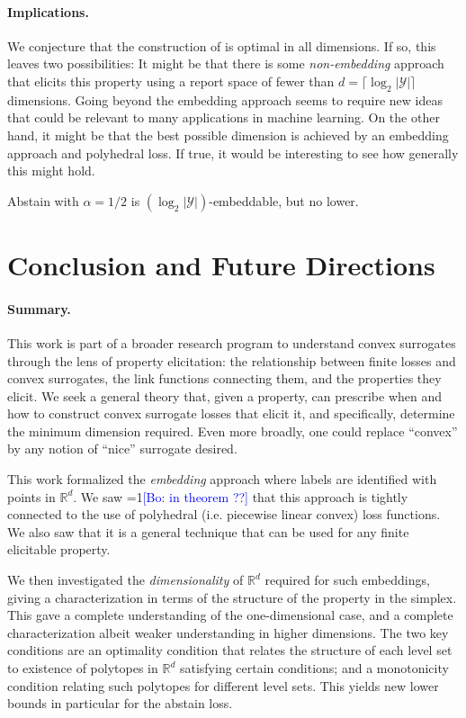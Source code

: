 \documentclass[anon,12pt]{colt2019}
\newcommand{\Comments}{1}
\newcommand{\mynote}[2]{\ifnum\Comments=1\textcolor{#1}{#2}\fi}
\newcommand{\bo}[1]{\mynote{blue}{[Bo: #1]}}
\newcommand{\reals}{\mathbb{R}}
\newcommand{\Y}{\mathcal{Y}}
\begin{document}
\paragraph{Implications.}
We conjecture that the construction of \citet{ramaswamy2018consistent} is optimal in all dimensions.
If so, this leaves two possibilities: It might be that there is some \emph{non-embedding} approach that elicits this property using a report space of fewer than $d=\lceil \log_2 |\Y|\rceil$ dimensions.
Going beyond the embedding approach seems to require new ideas that could be relevant to many applications in machine learning.
On the other hand, it might be that the best possible dimension is achieved by an embedding approach and polyhedral loss.
If true, it would be interesting to see how generally this might hold.
\begin{conjecture}\label{conj:abstain-tight}
  Abstain with $\alpha=1/2$ is $(\log_2 |\Y|)$-embeddable, but no lower.
\end{conjecture}

\section{Conclusion and Future Directions} \label{sec:conclusion}
\paragraph{Summary.}
This work is part of a broader research program to understand convex surrogates through the lens of property elicitation: the relationship between finite losses and convex surrogates, the link functions connecting them, and the properties they elicit.
We seek a general theory that, given a property, can prescribe when and how to construct convex surrogate losses that elicit it, and specifically, determine the minimum dimension required.
Even more broadly, one could replace ``convex'' by any notion of ``nice'' surrogate desired.

This work formalized the \emph{embedding} approach where labels are identified with points in $\reals^d$.
We saw \bo{in theorem ??} that this approach is tightly connected to the use of polyhedral (i.e. piecewise linear convex) loss functions.
We also saw that it is a general technique that can be used for any finite elicitable property.

We then investigated the \emph{dimensionality} of $\reals^d$ required for such embeddings, giving a characterization in terms of the structure of the property in the simplex.
This gave a complete understanding of the one-dimensional case, and a complete characterization albeit weaker understanding in higher dimensions.
The two key conditions are an optimality condition that relates the structure of each level set to existence of polytopes in $\reals^d$ satisfying certain conditions; and a monotonicity condition relating such polytopes for different level sets.
This yields new lower bounds in particular for the abstain loss.
\end{document}
